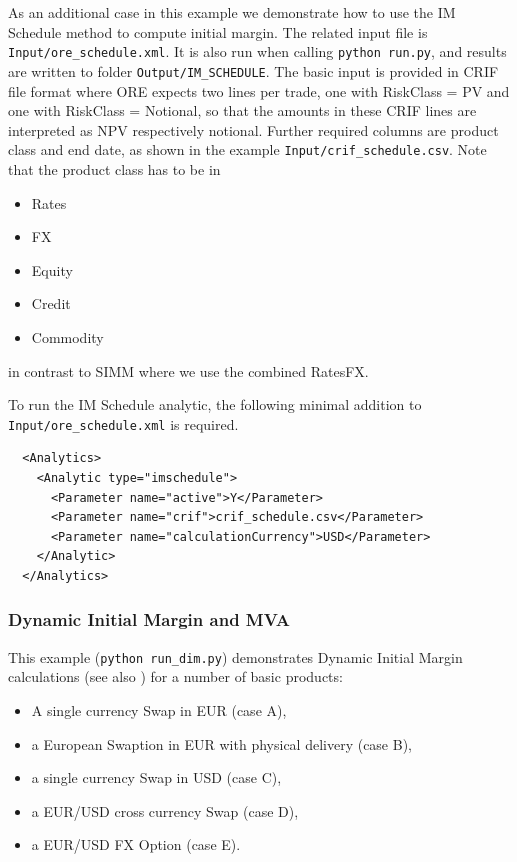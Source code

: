 As an additional case in this example we demonstrate how to use the IM Schedule method to compute initial margin.
The related input file is {\tt Input/ore\_schedule.xml}. It is also run when calling {\tt python run.py}, and results are written to folder
{\tt Output/IM\_SCHEDULE}.
The basic input is provided in CRIF file format where ORE expects two lines per trade, one with RiskClass = PV and one with RiskClass = Notional,
so that the  amounts in these CRIF lines are interpreted as NPV respectively notional.
Further required columns are product class and end date, as shown in the example {\tt Input/crif\_schedule.csv}. Note that the product class has to be in
\begin{itemize}
  \item Rates
  \item FX
  \item Equity
  \item Credit
  \item Commodity
\end{itemize}
in contrast to SIMM where we use the combined RatesFX.

To run the IM Schedule analytic, the following minimal addition to {\tt Input/ore\_schedule.xml} is required.
\begin{verbatim}
  <Analytics>
    <Analytic type="imschedule">
      <Parameter name="active">Y</Parameter>
      <Parameter name="crif">crif_schedule.csv</Parameter>
      <Parameter name="calculationCurrency">USD</Parameter>
    </Analytic>
  </Analytics>
\end{verbatim}

\subsubsection{Dynamic Initial Margin and MVA}\label{example:initialmargin_dim}

This example ({\tt python run\_dim.py}) demonstrates Dynamic Initial Margin calculations (see also \cite{methods}) for a number of basic products:
\begin{itemize}
\item A single currency Swap in EUR (case A),
\item a European Swaption in EUR with physical delivery (case B),
\item a single currency Swap in USD (case C),
\item a EUR/USD cross currency Swap (case D),
\item a EUR/USD FX Option (case E).
\end{itemize}

